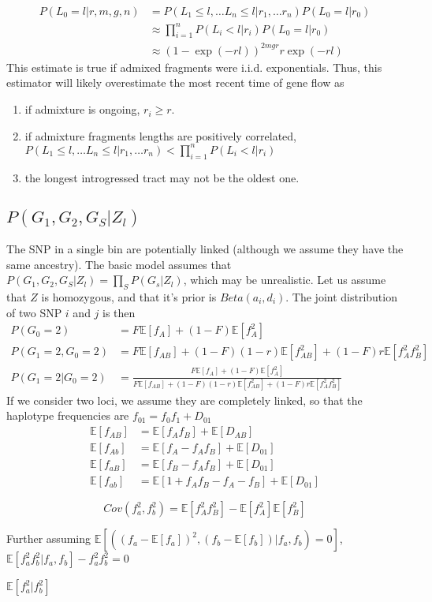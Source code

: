 \documentclass[10pt,a4paper]{article}
\newcommand{\BE}[1]{\mathbb{E}\left[#1\right]}
\begin{document}
\begin{align}
P(L_0=l | r, m, g, n) 
&= P(L_1 \leq l, \dots L_n \leq l | r_1, \dots r_n) P(L_0 = l | r_0)\nonumber\\
&\approx \prod_{i=1}^n P(L_i < l| r_i) P(L_0 = l | r_0)\nonumber\\
&\approx (1- \exp( -r l ))^{2m g r} r \exp ( -r l)
\end{align}
This estimate is true if admixed fragments were i.i.d. exponentials. Thus, this estimator will likely overestimate the most recent time of gene flow as
\begin{enumerate}
	\item if admixture is ongoing, $r_i \geq r$.
	\item if admixture fragments lengths are positively correlated, $P(L_1 \leq l, \dots L_n \leq l | r_1, \dots r_n) < \prod_{i=1}^n P(L_i < l| r_i)$
	\item the longest introgressed tract may not be the oldest one.
\end{enumerate}


\subsection{$P(G_1, G_2, G_S|Z_l)$}
The SNP in a single bin are potentially linked (although we assume they have the same ancestry).
The basic model assumes that 
$P(G_1, G_2, G_S|Z_l) = \prod_S P(G_s|Z_l)$, which may be unrealistic. Let us assume that $Z$ is homozygous, and that it's prior is $Beta(a_i,d_i)$. The joint distribution of two SNP $i$ and $j$ is then
\begin{align}
P(G_0=2) &= F \BE{f_A} + (1-F) \BE{f_A^2}\\
P(G_1=2,  G_0 = 2) &= F \BE{f_{AB}} + (1-F)(1-r) \BE{f_{AB}^2} + (1-F)r\BE{f_{A}^2f_{B}^2}\\
P(G_1=2 | G_0 = 2) &= \frac{F\BE{f_A} + (1-F) \BE{f_A^2}}{F \BE{f_{AB}} + (1-F)(1-r) \BE{f_{AB}^2} + (1-F)r\BE{f_{A}^2f_{B}^2}}
\end{align}
If we consider two loci, we assume they are completely linked, so that the haplotype frequencies are $f_{01} = f_0 f_1 + D_{01}$
\begin{align}
\BE{f_{AB}} &= \BE{f_A f_B} + \BE{D_{AB}}\\
\BE{f_{Ab}} &= \BE{f_A-f_Af_B} + \BE{D_{01}}\\
\BE{f_{aB}} &= \BE{f_B-f_Af_B} + \BE{D_{01}}\\
\BE{f_{ab}} &= \BE{1 + f_Af_B - f_A - f_B} + \BE{D_{01}}
\end{align}

$$Cov(f_a^2, f_b^2) = \BE{f_{A}^2f_{B}^2} -  \BE{f_A^2}\BE{f_B^2}$$

Further assuming
$\BE{ ( (f_a-\BE{f_a})^2, (f_b-\BE{f_b}) | f_a, f_b) = 0}$,
$\BE{f_a^2f_b^2 | f_a, f_b} - f_a^2f_b^2=0$

$\BE{f_a^2 | f_b^2}$
\end{document}
